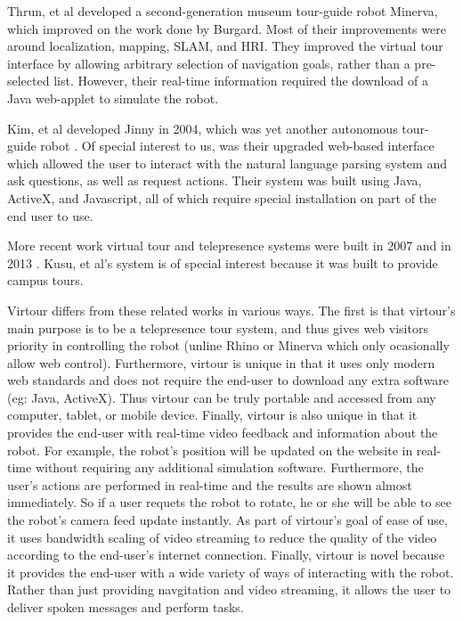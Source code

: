\documentclass[
  oneside,
  11pt, a4paper,
  footinclude=true,
  headinclude=true,
  cleardoublepage=empty
]{article}
\begin{document}
Thrun, et al developed a second-generation museum tour-guide robot
\cite{thrun1999} Minerva, which improved on the work done by Burgard. Most of
their improvements were around localization, mapping, SLAM, and HRI. They
improved the virtual tour interface by allowing arbitrary selection of
navigation goals, rather than a pre-selected list. However, their real-time
information required the download of a Java web-applet to simulate the robot.

Kim, et al developed Jinny in 2004, which was yet another autonomous tour-guide
robot \cite{kim2004}.  Of special interest to us, was their upgraded web-based
interface which allowed the user to interact with the natural language parsing
system and ask questions, as well as request actions. Their system was built
using Java, ActiveX, and Javascript, all of which require special installation
on part of the end user to use.

More recent work virtual tour and telepresence systems were built in 2007
\cite{michaud2007} and in 2013 \cite{kusu2013}. Kusu, et al's system is of special interest
because it was built to provide campus tours.

Virtour differs from these related works in various ways. The first is that
virtour's main purpose is to be a telepresence tour system, and thus gives web
visitors priority in controlling the robot (unline Rhino or Minerva which only
ocasionally allow web control). Furthermore, virtour is unique in that it uses
only modern web standards and does not require the end-user to download any
extra software (eg: Java, ActiveX). Thus virtour can be truly portable and
accessed from any computer, tablet, or mobile device. Finally, virtour is also
unique in that it provides the end-user with real-time video feedback and
information about the robot. For example, the robot's position will be updated
on the website in real-time without requiring any additional simulation
software. Furthermore, the user's actions are performed in real-time and the
results are shown almost immediately. So if a user requets the robot to rotate,
he or she will be able to see the robot's camera feed update instantly.  As
part of virtour's goal of ease of use, it uses bandwidth scaling of video
streaming to reduce the quality of the video according to the end-user's
internet connection. Finally, virtour is novel because it provides the end-user
with a wide variety of ways of interacting with the robot. Rather than just
providing navgitation and video streaming, it allows the user to deliver spoken
messages and perform tasks.
\end{document}
